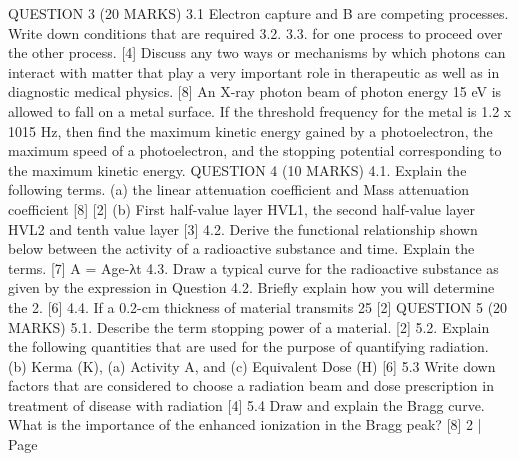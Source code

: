\documentclass[12pt]{article}  %
\begin{document}
\begin{enumerate}
QUESTION 3 (20 MARKS)
3.1 Electron capture and B are competing processes. Write down conditions that are required
3.2.
3.3.
for one process to proceed over the other process.
[4]
Discuss any two ways or mechanisms by which photons can interact with matter that play a very important role in therapeutic as well as in diagnostic medical physics.
[8]
An X-ray photon beam of photon energy 15 eV is allowed to fall on a metal surface. If the threshold frequency for the metal is 1.2 x 1015 Hz, then find the maximum kinetic energy gained by a photoelectron, the maximum speed of a photoelectron, and the stopping potential corresponding to the maximum kinetic energy.
QUESTION 4 (10 MARKS)
4.1. Explain the following terms.
(a) the linear attenuation coefficient and Mass attenuation coefficient
[8]
[2]
(b) First half-value layer HVL1, the second half-value layer HVL2 and tenth value layer [3]
4.2.
Derive the functional relationship shown below between the activity of a radioactive substance and time. Explain the terms.
[7]
A = Age-λt
4.3.
Draw a typical curve for the radioactive substance as given by the expression in Question 4.2. Briefly explain how you will determine the 2.
[6]
4.4.
If a 0.2-cm thickness of material transmits 25%
[2]
QUESTION 5 (20 MARKS)
5.1.
Describe the term stopping power of a material.
[2]
5.2.
Explain the following quantities that are used for the purpose of quantifying radiation. (b) Kerma (K), (a) Activity A,
and (c) Equivalent Dose (H)
[6]
5.3
Write down factors that are considered to choose a radiation beam and dose prescription in treatment of disease with radiation
[4]
5.4 Draw and explain the Bragg curve. What is the importance of the enhanced ionization in the Bragg peak?
[8]
2 | Page

﻿


\end{enumerate}
\end{document}
